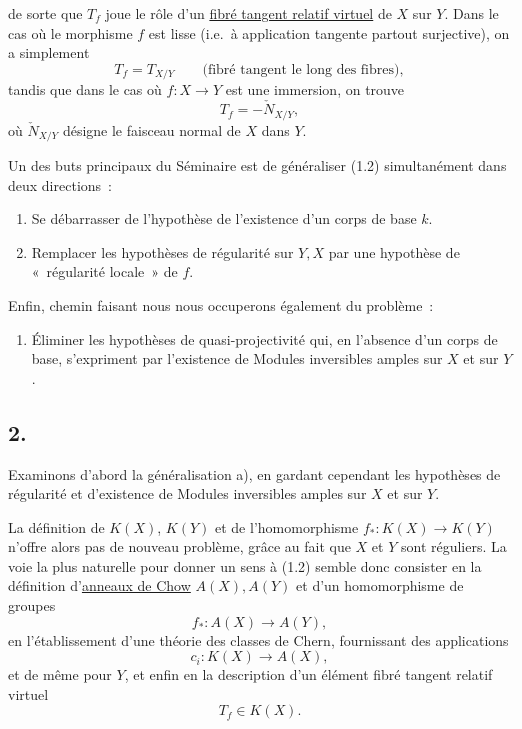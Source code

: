 de
sorte que $T_f$ joue le rôle d'un \underline{fibré tangent relatif virtuel} de $X$ sur $Y$. Dans le cas où le morphisme $f$ est lisse (i.e.\ à application tangente partout surjective), on a simplement
\[
T_f=T_{X/Y}\qquad\text{(fibré tangent le long des fibres)},
\]
tandis que dans le cas où $f:X\to Y$ est une immersion, on trouve
\[
T_f=-\check N_{X/Y},
\]
où $\check N_{X/Y}$ désigne le faisceau normal de $X$ dans $Y$.

Un des buts principaux du Séminaire est de généraliser (1.2) simultanément dans deux directions~:
\begin{enumerate}[label=\alph*)]
\item Se débarrasser de l'hypothèse de l'existence d'un corps de base $k$.
\item Remplacer les hypothèses de régularité sur $Y,X$ par une hypothèse de «~régularité locale~» de $f$.
\end{enumerate}
Enfin, chemin faisant nous nous occuperons également du problème~:
\begin{enumerate}[label=\alph*),start=3]
\item Éliminer les hypothèses de quasi-projectivité qui, en l'absence d'un corps de base, s'expriment par l'existence de Modules inversibles amples sur $X$ et sur $Y$.
\end{enumerate}

\subsection*{2.}
Examinons d'abord la généralisation a), en gardant cependant les hypothèses de régularité et d'existence de Modules inversibles amples sur $X$ et sur $Y$.

La définition de $K(X)$, $K(Y)$ et de l'homomorphisme $f_*:K(X)\to K(Y)$ n'offre alors pas de nouveau problème, grâce au fait que $X$ et $Y$ sont réguliers. La voie la plus naturelle pour donner un sens à (1.2) semble donc consister en la définition d'\underline{anneaux de Chow} $A(X),A(Y)$ et d'un homomorphisme de groupes
\[
f_*:A(X)\longrightarrow A(Y),
\]
en l'établissement d'une théorie des classes de Chern, fournissant des applications
\[
c_i:K(X)\longrightarrow A(X),
\]
et de même pour $Y$, et enfin en la description d'un élément fibré tangent relatif virtuel
\[
T_f\in K(X).
\]

